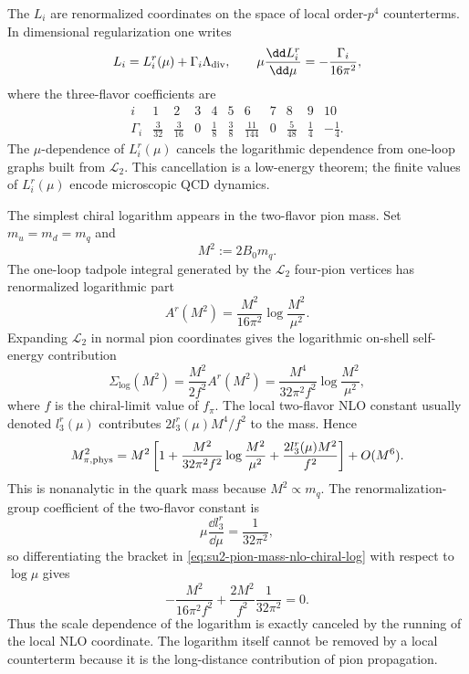 The \(L_i\) are renormalized coordinates on the space of local order-\(p^4\)
counterterms.  In dimensional regularization one writes
\[
  L_i=L_i^r(\mu)+\Gamma_i\Lambda_{\rm div},
  \qquad
  \mu\frac{\dd L_i^r}{\dd\mu}
  =
  -\frac{\Gamma_i}{16\pi^2},
\]
where the three-flavor coefficients are
\[
\begin{array}{c|cccccccccc}
i&1&2&3&4&5&6&7&8&9&10\\ \hline
\Gamma_i&
\frac{3}{32}&\frac{3}{16}&0&\frac18&\frac38&
\frac{11}{144}&0&\frac{5}{48}&\frac14&-\frac14 .
\end{array}
\]
The \(\mu\)-dependence of \(L_i^r(\mu)\) cancels the logarithmic dependence
from one-loop graphs built from \(\mathcal L_2\).  This cancellation is a
low-energy theorem; the finite values of \(L_i^r(\mu)\) encode microscopic
QCD dynamics.

The simplest chiral logarithm appears in the two-flavor pion mass.  Set
\(m_u=m_d=m_q\) and
\[
  M^2:=2B_0m_q .
\]
The one-loop tadpole integral generated by the \(\mathcal L_2\) four-pion
vertices has renormalized logarithmic part
\[
  A^r(M^2)
  =
  \frac{M^2}{16\pi^2}\log\frac{M^2}{\mu^2}.
\]
Expanding \(\mathcal L_2\) in normal pion coordinates gives the logarithmic
on-shell self-energy contribution
\[
  \Sigma_{\log}(M^2)
  =
  \frac{M^2}{2f^2}A^r(M^2)
  =
  \frac{M^4}{32\pi^2f^2}
  \log\frac{M^2}{\mu^2},
\]
where \(f\) is the chiral-limit value of \(f_\pi\).  The local two-flavor NLO
constant usually denoted \(l_3^r(\mu)\) contributes \(2l_3^r(\mu)M^4/f^2\) to
the mass.  Hence
\begin{equation}
  M_{\pi,\rm phys}^2
  =
  M^2
  \left[
    1
    +
    \frac{M^2}{32\pi^2f^2}\log\frac{M^2}{\mu^2}
    +
    \frac{2l_3^r(\mu)M^2}{f^2}
  \right]
  +O(M^6).
  \label{eq:su2-pion-mass-nlo-chiral-log}
\end{equation}
This is nonanalytic in the quark mass because \(M^2\propto m_q\).  The
renormalization-group coefficient of the two-flavor constant is
\[
  \mu\frac{\dd l_3^r}{\dd\mu}
  =
  \frac{1}{32\pi^2},
\]
so differentiating the bracket in
\eqref{eq:su2-pion-mass-nlo-chiral-log} with respect to \(\log\mu\) gives
\[
  -\frac{M^2}{16\pi^2f^2}
  +
  \frac{2M^2}{f^2}\frac{1}{32\pi^2}
  =
  0.
\]
Thus the scale dependence of the logarithm is exactly canceled by the running
of the local NLO coordinate.  The logarithm itself cannot be removed by a
local counterterm because it is the long-distance contribution of pion
propagation.

